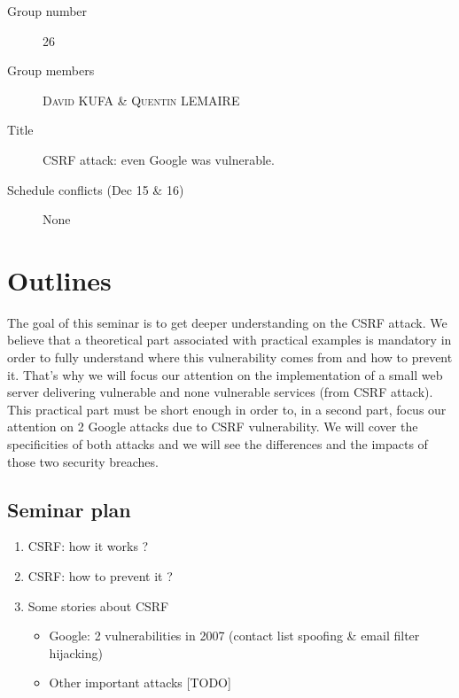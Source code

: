 \documentclass[a4paper,11pt]{article}
\begin{document}
  \begin{description}
   \item[Group number] 26
   \item[Group members] \textsc{David KUFA} \& \textsc{Quentin LEMAIRE}
   \item[Title] CSRF attack: even Google was vulnerable.
   \item[Schedule conflicts (Dec 15 \& 16)] None
  \end{description}

  \section{Outlines}
  
  
  
  The goal of this seminar is to get deeper understanding on the CSRF attack. We believe 
  that a theoretical part associated with practical examples is mandatory in order to fully understand 
  where this vulnerability comes from and how to prevent it. That's why we will focus our attention 
  on the implementation of a small web server delivering vulnerable and none vulnerable 
  services (from CSRF attack). This practical part must be short enough in order to, in a second part, focus our 
  attention on 2 Google attacks due to CSRF vulnerability. We will cover the specificities 
  of both attacks and we will see the differences and the impacts of those two security 
  breaches.
  
  \subsection{Seminar plan}
  
  \begin{enumerate}
   \item CSRF: how it works ?
   \item CSRF: how to prevent it ?
   \item Some stories about CSRF
   \begin{itemize}
    \item Google: 2 vulnerabilities in 2007 (contact list spoofing \& email filter hijacking)
    \item Other important attacks [TODO] %
   \end{itemize}
  \end{enumerate}
  
\end{document}

